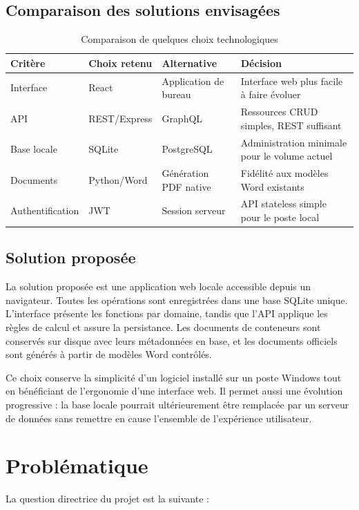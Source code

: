 \documentclass[12pt,a4paper,oneside]{report}
\begin{document}
\subsection{Comparaison des solutions envisagées}
\begin{table}[H]\centering
\caption{Comparaison de quelques choix technologiques}
\begin{tabularx}{\textwidth}{p{3cm}Y Y Y}
\toprule \textbf{Critère} & \textbf{Choix retenu} & \textbf{Alternative} & \textbf{Décision}\\ \midrule
Interface & React & Application de bureau & Interface web plus facile à faire évoluer\\
API & REST/Express & GraphQL & Ressources CRUD simples, REST suffisant\\
Base locale & SQLite & PostgreSQL & Administration minimale pour le volume actuel\\
Documents & Python/Word & Génération PDF native & Fidélité aux modèles Word existants\\
Authentification & JWT & Session serveur & API stateless simple pour le poste local\\
\bottomrule
\end{tabularx}
\end{table}

\subsection{Solution proposée}
La solution proposée est une application web locale accessible depuis un navigateur. Toutes les opérations sont enregistrées dans une base SQLite unique. L'interface présente les fonctions par domaine, tandis que l'API applique les règles de calcul et assure la persistance. Les documents de conteneurs sont conservés sur disque avec leurs métadonnées en base, et les documents officiels sont générés à partir de modèles Word contrôlés.

Ce choix conserve la simplicité d'un logiciel installé sur un poste Windows tout en bénéficiant de l'ergonomie d'une interface web. Il permet aussi une évolution progressive : la base locale pourrait ultérieurement être remplacée par un serveur de données sans remettre en cause l'ensemble de l'expérience utilisateur.

\section{Problématique}
La question directrice du projet est la suivante :
\end{document}
